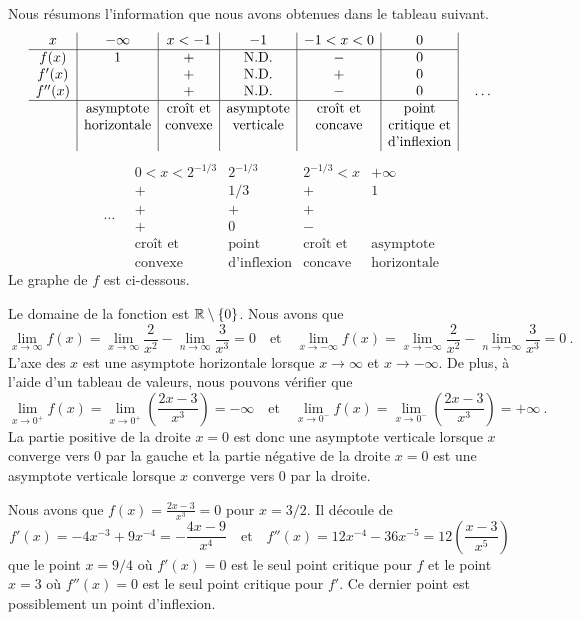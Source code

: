 {Nous résumons l'information que nous avons obtenues dans le tableau suivant.
\[
\begin{array}{c|c|c|c|c|c|}
x & -\infty & x<-1 & -1 & -1 < x < 0 & 0 \\
\hline
f(x) & 1 & + & \text{N.D.} & - & 0 \\
f'(x) &  & + & \text{N.D.} & + & 0 \\
f''(x) & & + & \text{N.D.} & - & 0 \\
\hline
& \text{asymptote} & \text{croît et} & \text{asymptote} & \text{croît et} &
\text{point} \\
& \text{horizontale} & \text{convexe} & \text{verticale} & \text{concave}
& \text{critique et} \\
& & & & & \text{d'inflexion}
\end{array} \quad \ldots
\]
\[
\qquad \ldots  \quad
\begin{array}{|c|c|c|c}
0<x<2^{-1/3} & 2^{-1/3} & 2^{-1/3} <x & +\infty \\
\hline
+ & 1/3 & + & 1 \\
+ & + & + & \\
+ & 0 & - & \\
\hline
\text{croît et} & \text{point} & \text{croît et} & \text{asymptote} \\
\text{convexe} & \text{d'inflexion} & \text{concave} & \text{horizontale}
\end{array}
\]
Le graphe de $f$ est ci-dessous.

 Le domaine de la fonction est $\mathbb{R}\setminus \{0\}$.
Nous avons que
\[
\lim_{x\rightarrow \infty} f(x)
= \lim_{x\rightarrow \infty} \frac{2}{x^2} - \lim_{n\to \infty} \frac{3}{x^3}
= 0
\quad \text{et} \quad
\lim_{x\rightarrow -\infty} f(x) =
\lim_{x\rightarrow -\infty} \frac{2}{x^2} - \lim_{n\to -\infty} \frac{3}{x^3} = 0
\ .
\]
L'axe des $x$ est une asymptote horizontale lorsque $x\to \infty$ et
$x\to -\infty$.  De plus, à l'aide d'un tableau de valeurs, nous pouvons
vérifier que
\[
\lim_{x\rightarrow 0^+} f(x) = 
\lim_{x\rightarrow 0^+} \left( \frac{2x-3}{x^3} \right) = -\infty
\quad \text{et} \quad
\lim_{x\rightarrow 0^-} f(x) = 
\lim_{x\rightarrow 0^-} \left( \frac{2x-3}{x^3} \right) = +\infty \ .
\]
La partie positive de la droite $x=0$ est donc une asymptote verticale
lorsque $x$ converge vers $0$ par la gauche et la partie négative de la
droite $x=0$ est une asymptote verticale lorsque $x$ converge vers $0$
par la droite.

Nous avons que $\displaystyle f(x)= \frac{2x-3}{x^3} = 0$ pour $x = 3/2$.
Il découle de
\[
f'(x) = -4x^{-3} + 9 x^{-4} = -\frac{4x-9}{x^4}
\quad \text{et} \quad
f''(x) = 12x^{-4} - 36 x^{-5} = 12 \left(\frac{x-3}{x^5}\right)
\]
que le point $x=9/4$ où $f'(x)=0$ est le seul point critique pour $f$
et le point $x=3$ où $f''(x)=0$ est le seul point critique pour $f'$.
Ce dernier point est possiblement un point d'inflexion.

}
